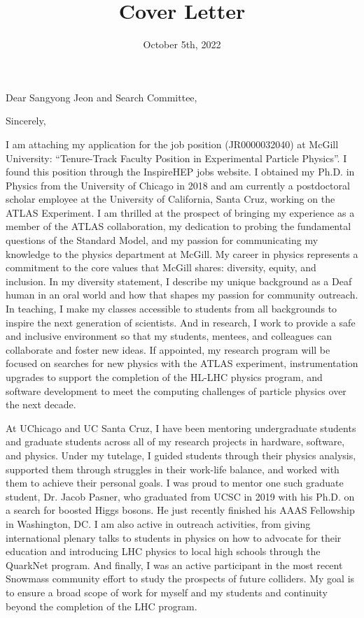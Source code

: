 \documentclass[10pt,letterpaper,sans]{moderncv} %
\title{Cover Letter}
\begin{document}
\date{October 5th, 2022}
\opening{Dear Sangyong Jeon and Search Committee,}
\closing{Sincerely,}

\makelettertitle
\vspace*{-1em}

I am attaching my application for the job position (JR0000032040) at McGill University: ``Tenure-Track Faculty Position in Experimental Particle Physics''. I found this position through the InspireHEP jobs website. I obtained my Ph.D. in Physics from the University of Chicago in 2018 and am currently a postdoctoral scholar employee at the University of California, Santa Cruz, working on the ATLAS Experiment. I am thrilled at the prospect of bringing my experience as a member of the ATLAS collaboration, my dedication to probing the fundamental questions of the Standard Model, and my passion for communicating my knowledge to the physics department at McGill. My career in physics represents a commitment to the core values that McGill shares: diversity, equity, and inclusion. In my diversity statement, I describe my unique background as a Deaf human in an oral world and how that shapes my passion for community outreach. In teaching, I make my classes accessible to students from all backgrounds to inspire the next generation of scientists. And in research, I work to provide a safe and inclusive environment so that my students, mentees, and colleagues can collaborate and foster new ideas. If appointed, my research program will be focused on searches for new physics with the ATLAS experiment, instrumentation upgrades to support the completion of the HL-LHC physics program, and software development to meet the computing challenges of particle physics over the next decade.

At UChicago and UC Santa Cruz, I have been mentoring undergraduate students and graduate students across all of my research projects in hardware, software, and physics. Under my tutelage, I guided students through their physics analysis, supported them through struggles in their work-life balance, and worked with them to achieve their personal goals. I was proud to mentor one such graduate student, Dr. Jacob Pasner, who graduated from UCSC in 2019 with his Ph.D. on a search for boosted Higgs bosons. He just recently finished his AAAS Fellowship in Washington, DC. I am also active in outreach activities, from giving international plenary talks to students in physics on how to advocate for their education and introducing LHC physics to local high schools through the QuarkNet program. And finally, I was an active participant in the most recent Snowmass community effort to study the prospects of future colliders. My goal is to ensure a broad scope of work for myself and my students and continuity beyond the completion of the LHC program.
\end{document}
